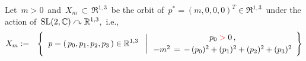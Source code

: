 \vskip 0.5cm
\noindent
Let \,$m > 0$\, and
\,$X_{m} \,\subset\, \Re^{1,3}$\,
be the orbit of
\,$p^{*} = (m,0,0,0)^{T} \in \Re^{1,3}$\,
under the action of
\,$\textnormal{SL}(2,\mathbb{C}) \curvearrowright \mathbb{R}^{1,3}$,\,
i.e.,
\begin{eqnarray*}
X_{m}
& := &
	\left\{\;\,
		\left.
		p = (\,p_{0},p_{1},p_{2},p_{3}\,)
		\overset{{\color{white}1}}{\in}
		\Re^{1,3}
		\;\;\;\right\vert
		\begin{array}{c}
			p_{0} \;{\color{red}>}\; 0\,,
			\\
			-m^{2} \, \overset{{\color{white}1}}{=} \, -\,(p_{0})^{2} + (p_{1})^{2} + (p_{2})^{2} + (p_{3})^{2}
			\end{array}
		\right\}
\end{eqnarray*}



